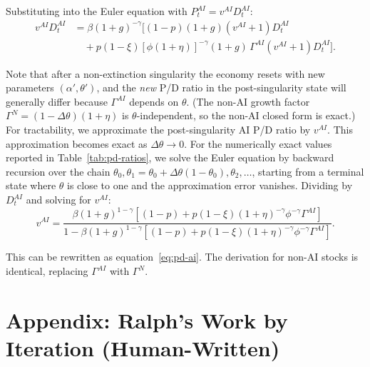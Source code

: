 \documentclass[12pt]{article}
\begin{document}
Substituting into the Euler equation with $P_t^{AI} = v^{AI} D_t^{AI}$:
\begin{equation} \label{eq:euler-expand}
\begin{split}
v^{AI} D_t^{AI} &= \beta(1+g)^{-\gamma} \Big[ (1-p)(1+g)(v^{AI}+1) D_t^{AI} \\
&\quad + p(1-\xi) [\phi(1+\eta)]^{-\gamma} (1+g) \, \Gamma^{AI} (v^{AI}+1) D_t^{AI} \Big].
\end{split}
\end{equation}

Note that after a non-extinction singularity the economy resets with new parameters $(\alpha', \theta')$, and the \emph{new} P/D ratio in the post-singularity state will generally differ because $\Gamma^{AI}$ depends on $\theta$. (The non-AI growth factor $\Gamma^{N} = (1-\Delta\theta)(1+\eta)$ is $\theta$-independent, so the non-AI closed form is exact.) For tractability, we approximate the post-singularity AI P/D ratio by $v^{AI}$. This approximation becomes exact as $\Delta\theta \to 0$. For the numerically exact values reported in Table~\ref{tab:pd-ratios}, we solve the Euler equation by backward recursion over the chain $\theta_0, \theta_1 = \theta_0 + \Delta\theta(1-\theta_0), \theta_2, \ldots$, starting from a terminal state where $\theta$ is close to one and the approximation error vanishes. Dividing by $D_t^{AI}$ and solving for $v^{AI}$:
%
\begin{equation}
v^{AI} = \frac{\beta(1+g)^{1-\gamma}\left[(1-p) + p(1-\xi)(1+\eta)^{-\gamma}\phi^{-\gamma} \Gamma^{AI}\right]}{1 - \beta(1+g)^{1-\gamma}\left[(1-p) + p(1-\xi)(1+\eta)^{-\gamma}\phi^{-\gamma} \Gamma^{AI}\right]}. \label{eq:pd-ai-solve}
\end{equation}

This can be rewritten as equation~\eqref{eq:pd-ai}. The derivation for non-AI stocks is identical, replacing $\Gamma^{AI}$ with $\Gamma^{N}$.

\clearpage
\section{Appendix: Ralph's Work by Iteration (Human-Written)} \label{appendix:iter-log}

\providecommand{\rloopcommit}[2]{\href{https://github.com/chenandrewy/ralph-wiggum-asset-pricing/commit/#2}{\textcolor{blue}{\texttt{#1}}}}
\providecommand{\testresult}[1]{\href{https://github.com/chenandrewy/ralph-wiggum-asset-pricing/blob/42ce3a298a6c9e9ec144949346034b8af9055646/test-results/#1.md}{\textcolor{blue}{\texttt{#1}}}}
\providecommand{\penultimatetestresult}[1]{\href{https://github.com/chenandrewy/ralph-wiggum-asset-pricing/blob/36c13367ef5980dcf1e7e4963d89a7722c8377d0/test-results/#1.md}{\textcolor{blue}{\texttt{#1}}}}
\providecommand{\finaltestresult}[1]{\href{https://github.com/chenandrewy/ralph-wiggum-asset-pricing/blob/bf0af226ad2d15302dbe1c2878a1c2f66192e340/test-results/#1.md}{\textcolor{blue}{\texttt{#1}}}}
\end{document}

